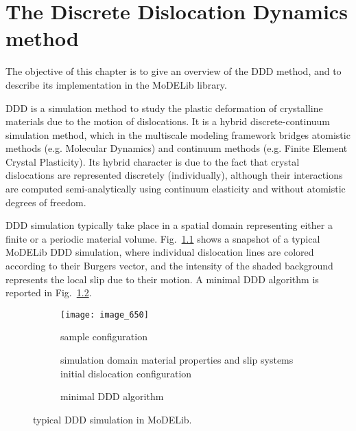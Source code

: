 \newpage
\chapter{The Discrete Dislocation Dynamics method}

The objective of this chapter is to give an overview of the DDD method, and to describe its implementation in the MoDELib library. 

DDD is a simulation method to study the plastic deformation of crystalline materials due to the motion of dislocations. 
It is a hybrid discrete-continuum simulation method, which  in the multiscale modeling framework bridges   atomistic  methods (e.g. Molecular Dynamics) and continuum methods (e.g. Finite Element Crystal Plasticity). 
Its hybrid character is due to the fact that crystal dislocations are represented discretely (individually), although their interactions are computed semi-analytically using continuum elasticity and without atomistic degrees of freedom.
 
DDD simulation typically take place in a spatial domain representing either a finite or a periodic material volume. Fig.~\ref{DDDnutshellA} shows a snapshot of a typical MoDELib DDD simulation, where individual dislocation lines are colored according to their Burgers vector, and the intensity of the shaded background represents the local slip due to their motion.  A minimal DDD algorithm is reported in Fig.~\ref{DDDnutshellB}. 




 \begin{figure}[h]
 \centering
  \begin{subfigure}{.48\textwidth}
 \texttt{[image: image\_650]}
 \caption{sample configuration}
  \label{DDDnutshellA}
\end{subfigure}
  \begin{subfigure}{.48\textwidth}
\begin{algorithm}[H]
\MyInit{}
 {
simulation domain\;
material properties and slip systems\;
initial dislocation configuration\;
 }
\end{algorithm}
 \caption{minimal DDD algorithm}
     \label{DDDnutshellB}
\end{subfigure}
  \caption{typical  DDD simulation in MoDELib. }
    \label{DDDnutshell}
 \end{figure}
 
